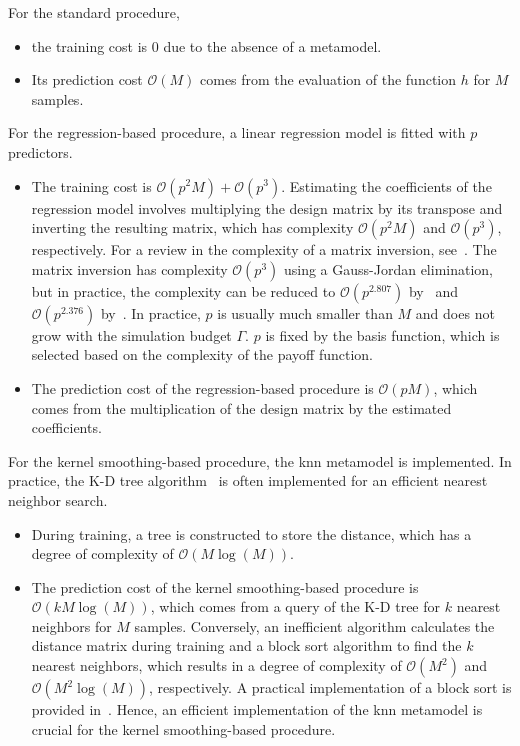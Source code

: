 For the standard procedure, 
\begin{itemize}
    \item the training cost is $0$ due to the absence of a metamodel. 
    \item Its prediction cost $\mathcal{O}(M)$ comes from the evaluation of the function $h$ for $M$ samples.
\end{itemize}
For the regression-based procedure, a linear regression model is fitted with $p$ predictors.
\begin{itemize}
    \item The training cost is $\mathcal{O}(p^2M) + \mathcal{O}(p^3)$.
          Estimating the coefficients of the regression model involves multiplying the design matrix by its transpose and inverting the resulting matrix, which has complexity $\mathcal{O}(p^2M)$ and $\mathcal{O}(p^3)$, respectively.
          For a review in the complexity of a matrix inversion, see~\cite{stothers2010complexity}.
          The matrix inversion has complexity $\mathcal{O}(p^3)$ using a Gauss-Jordan elimination, but in practice, the complexity can be reduced to $\mathcal{O}(p^{2.807})$ by~\cite{strassen1969gaussian} and $\mathcal{O}(p^{2.376})$ by~\cite{coppersmith1987matrix}.
          In practice, $p$ is usually much smaller than $M$ and does not grow with the simulation budget $\Gamma$.
          $p$ is fixed by the basis function, which is selected based on the complexity of the payoff function.
    \item The prediction cost of the regression-based procedure is $\mathcal{O}(pM)$, which comes from the multiplication of the design matrix by the estimated coefficients.
\end{itemize}
For the kernel smoothing-based procedure, the \gls{knn} metamodel is implemented. 
In practice, the K-D tree algorithm~\citep{bentley1975multidimensional} is often implemented for an efficient nearest neighbor search.
\begin{itemize}
    \item During training, a tree is constructed to store the distance, which has a degree of complexity of $\mathcal{O}(M\log(M))$.
    \item The prediction cost of the kernel smoothing-based procedure is $\mathcal{O}(kM\log(M))$, which comes from a query of the K-D tree for $k$ nearest neighbors for $M$ samples.
    Conversely, an inefficient algorithm calculates the distance matrix during training and a block sort algorithm to find the $k$ nearest neighbors, which results in a degree of complexity of $\mathcal{O}(M^2)$ and $\mathcal{O}(M^2\log(M))$, respectively.
    A practical implementation of a block sort is provided in~\cite{kim2008ratio}.
    Hence, an efficient implementation of the \gls{knn} metamodel is crucial for the kernel smoothing-based procedure.
\end{itemize}
